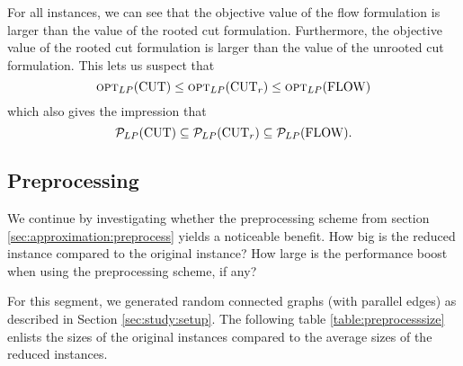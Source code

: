 For all instances, we can see that the objective value of the flow formulation is larger than the value of the rooted cut formulation. Furthermore, the objective value of the rooted cut formulation is larger than the value of the unrooted cut formulation. This lets us suspect that
$$\textsc{opt}_{LP}(\mathrm{CUT}) \leq \textsc{opt}_{LP}(\mathrm{CUT}_r) \leq \textsc{opt}_{LP}(\mathrm{FLOW})$$
which also gives the impression that
$$\mathcal{P}_{LP}(\mathrm{CUT}) \subseteq \mathcal{P}_{LP}(\mathrm{CUT}_r) \subseteq \mathcal{P}_{LP}(\mathrm{FLOW}).$$

\subsection{Preprocessing}
\label{sec:study:preprocess}

We continue by investigating whether the preprocessing scheme from section \ref{sec:approximation:preprocess} yields a noticeable benefit. How big is the reduced instance compared to the original instance? How large is the performance boost when using the preprocessing scheme, if any?\medskip

For this segment, we generated random connected graphs (with parallel edges) as described in Section \ref{sec:study:setup}. The following table \ref{table:preprocesssize} enlists the sizes of the original instances compared to the average sizes of the reduced instances.

